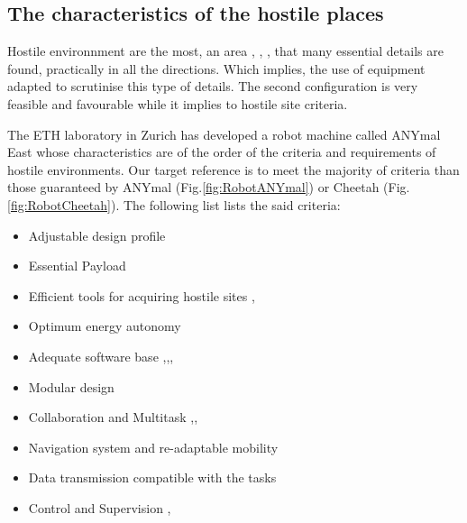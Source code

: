 \documentclass[Afour,sageh,times]{sagej}
\begin{document}
\subsection{The characteristics of the hostile places}
Hostile environnment are the most, an area \citep{Strabala2013}, \citep{Cully2015}, \citep{DAndola2018}, that many essential details are found, practically in all the directions. Which implies, the use of equipment adapted to scrutinise this type of details. The second configuration is very feasible and favourable while it implies to hostile site criteria.

The ETH laboratory in Zurich has developed a robot machine called ANYmal East whose characteristics are of the order of the criteria and requirements of hostile environments.
Our target reference is to meet the majority of criteria \citep{Kolling2016} than those guaranteed by ANYmal (Fig.\ref{fig:RobotANYmal}) or Cheetah (Fig.\ref{fig:RobotCheetah}). The following list lists the said criteria:

\begin{itemize}
    \item Adjustable design profile \citep{Duquette2008}
    \item Essential Payload
    \item Efficient tools for acquiring hostile sites \citep{Drotman2017},\citep{Boumediene2012}
    \item Optimum energy autonomy \citep{Kim2010}
    \item Adequate software base \citep{Quigley2009},\citep{EnriqueFernandezLuisSanchezCrespoAnilMahtani2015},\citep{Kortenkamp2008},\citep{mtamali2006}
    \item Modular design \citep{Indicated1987}
    \item Collaboration and Multitask \citep{Dahl2009},\citep{Parker2009},\citep{Rekleitis2001}
    \item Navigation system and re-adaptable mobility \citep{Handfield2002}
    \item Data transmission compatible with the tasks \citep{Gerkey2004}
    \item Control and Supervision \citep{Geng2009}, \citep{Hahnel2003}
\end{itemize}
\end{document}
